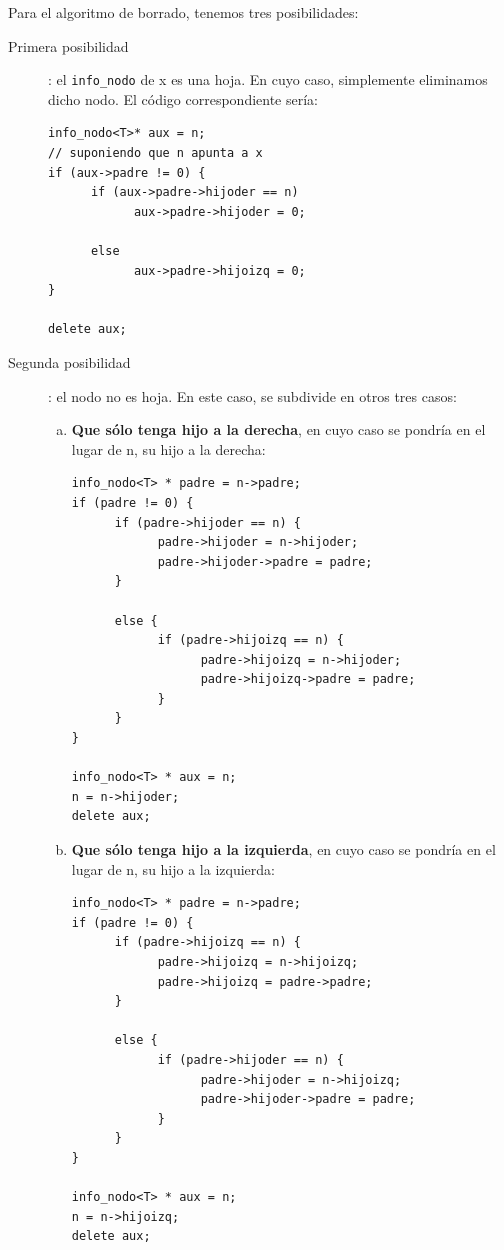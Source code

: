 \documentclass[10pt,a4paper,spanish]{report}
\begin{document}
\noindent
Para el algoritmo de borrado, tenemos tres posibilidades:
\begin{description}
\item[Primera posibilidad]: el \verb*|info_nodo| de x es una hoja. En cuyo caso, simplemente eliminamos dicho nodo. El código correspondiente sería:
\begin{verbatim}
info_nodo<T>* aux = n;
// suponiendo que n apunta a x
if (aux->padre != 0) {
      if (aux->padre->hijoder == n)
            aux->padre->hijoder = 0;

      else
            aux->padre->hijoizq = 0;
}

delete aux;
\end{verbatim}

\item[Segunda posibilidad]: el nodo no es hoja. En este caso, se subdivide en otros tres casos:
\begin{enumerate}[a)]
      \item \textbf{\textcolor[rgb]{0.3,0.4,0.8}{Que sólo tenga hijo a la derecha}}, en cuyo caso se pondría en el lugar de n, su hijo a la derecha:
\begin{verbatim}
info_nodo<T> * padre = n->padre;
if (padre != 0) {
      if (padre->hijoder == n) {
            padre->hijoder = n->hijoder;
            padre->hijoder->padre = padre;
      }

      else {
            if (padre->hijoizq == n) {
                  padre->hijoizq = n->hijoder;
                  padre->hijoizq->padre = padre;
            }
      }
}

info_nodo<T> * aux = n;
n = n->hijoder;
delete aux;
\end{verbatim}

\item \textbf{\textcolor[rgb]{0.3,0.4,0.8}{Que sólo tenga hijo a la izquierda}}, en cuyo caso se pondría en el lugar de n, su hijo a la izquierda:
\begin{verbatim}
info_nodo<T> * padre = n->padre;
if (padre != 0) {
      if (padre->hijoizq == n) {
            padre->hijoizq = n->hijoizq;
            padre->hijoizq = padre->padre;
      }

      else {
            if (padre->hijoder == n) {
                  padre->hijoder = n->hijoizq;
                  padre->hijoder->padre = padre;
            }
      }
}

info_nodo<T> * aux = n;
n = n->hijoizq;
delete aux;
\end{verbatim}


\end{enumerate}
\end{description}
\end{document}
